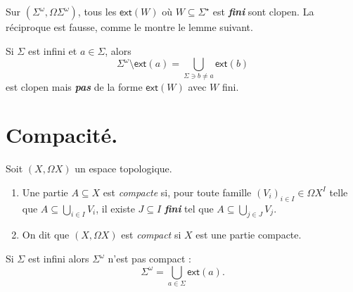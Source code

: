 \documentclass[./main]{subfiles}
\begin{document}
  \begin{rmk}
    Sur $(\Sigma^\omega, \Omega\Sigma^\omega)$, tous les $\mathsf{ext}(W)$ où $W \subseteq \Sigma^\star$ est \textit{\textbf{fini}} sont clopen.
    La réciproque est fausse, comme le montre le lemme suivant.
  \end{rmk}

  \begin{lem}
    Si $\Sigma$ est infini et $a \in \Sigma$, alors
    \[
    \Sigma^\omega \setminus \mathsf{ext}(a) = \bigcup_{\Sigma \ni b \neq a}  \mathsf{ext}(b)
    \]
    est clopen mais \textit{\textbf{pas}} de la forme $\mathsf{ext}(W)$ avec $W$ fini.
  \end{lem}

  \section{Compacité.}

  \begin{defn}
    Soit $(X, \Omega X)$ un espace topologique.
     \begin{enumerate}
      \item Une partie $A \subseteq X$ est \textit{compacte} si, pour toute famille $(V_i)_{i \in I} \in \Omega X^I$ telle que $A \subseteq \bigcup_{i \in  I} V_i$, il existe $J \subseteq I$ \textit{\textbf{fini}} tel que $A \subseteq \bigcup_{j \in J} V_j$.
      \item On dit que $(X, \Omega X)$ est \textit{compact} si $X$ est une partie compacte.
    \end{enumerate}
  \end{defn}

  \begin{rmk}
    Si $\Sigma$ est infini alors $\Sigma^\omega$ n'est pas compact :
    \[
    \Sigma^\omega = \bigcup_{a \in \Sigma} \mathsf{ext}(a)
    .\]
  \end{rmk}
\end{document}
